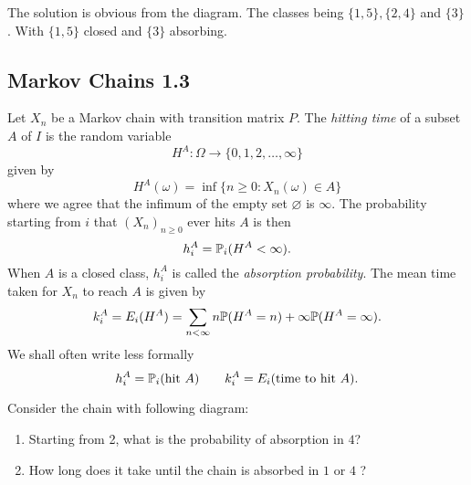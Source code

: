 The solution is obvious from the diagram. The classes being \(\{1,5\}, \{2,4\}\) and \(\{3\}\). With  \(\{1,5\}\) closed and \(\{3\}\) absorbing.

\subsection{Markov Chains 1.3}
\begin{defn}
Let \(X_{n}\) be a Markov chain with transition matrix \(P\). The \emph{hitting time} of a subset \(A\) of \(I\) is the random variable
\[
H^A: \Omega \rightarrow \{0,1,2,\ldots ,\infty \}
\]
given by
\[
H^A(\omega )=\inf\{n\geq 0 :X_{n}(\omega )\in A\}
\]
where we agree that the infimum of the empty set \(\varnothing \) is \(\infty \). The probability starting from \(i\) that \((X_{n})_{n\geq 0}\) ever hits \(A\) is then
\[
h_{i}^A=\Bbb{P}_{i}(H^A<\infty ).
\]
When \(A\) is a closed class, \(h_{i}^A\) is called the \emph{absorption probability}. The mean time taken for \(X_{n}\) to reach \(A\) is given by
\[
k_{i}^A=E_{i}(H^A)=\sum _{n<\infty }n\Bbb{P}(H^A=n)+\infty \Bbb{P}(H^A=\infty ).
\]
We shall often write less formally
\[
h_{i}^A=\Bbb{P}_{i}(\text{hit }A) \qquad k_{i}^A=E_{i}(\text{time to hit }A).
\]
\end{defn}

\begin{thm}[Example 1.3.1]
Consider the chain with following diagram:


\begin{enumerate}
  \item Starting from 2, what is the probability of absorption in \(4\)?
  \item How long does it take until the chain is absorbed in \(1\) or \(4\) ?
\end{enumerate}
\end{thm}


